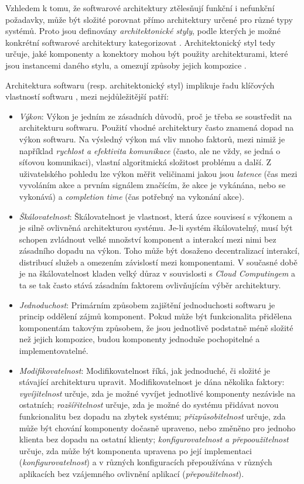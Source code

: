 Vzhledem k tomu, že softwarové architektury ztělesňují funkční i nefunkční požadavky, může být složité porovnat přímo architektury určené pro různé typy systémů. Proto jsou definovány \textit{architektonické styly}, podle kterých je možné konkrétní softwarové architektury kategorizovat \cite{Nitto99}. Architektonický styl tedy určuje, jaké komponenty a konektory mohou být použity architekturami, které jsou instancemi daného stylu, a omezují způsoby jejich kompozice \cite{Garlan95}.

Architektura softwaru (resp. architektonický styl) implikuje řadu klíčových vlastností softwaru \cite{Ghezzi03}, mezi nejdůležitější patří:
\begin{itemize}
  \item{\textit{Výkon}}: Výkon je jedním ze zásadních důvodů, proč je třeba se soustředit na architekturu softwaru. Použití vhodné architektury často znamená dopad na výkon softwaru. Na výsledný výkon má vliv mnoho faktorů, mezi nimiž je například \textit{rychlost a efektivita komunikace} (často, ale ne vždy, se jedná o síťovou komunikaci), vlastní algoritmická složitost problému a další. Z uživatelského pohledu lze výkon měřit veličinami jakou jsou \textit{latence} (čas mezi vyvoláním akce a prvním signálem značícím, že akce je vykánána, nebo se vykonává) a \textit{completion time} (čas potřebný na vykonání akce).
  \item{\textit{Škálovatelnost}}: Škálovatelnost je vlastnost, která úzce souvisesí s výkonem a je silně ovlivněná architekturou systému. Je-li systém škálovatelný, musí být schopen zvládnout velké množství komponent a interakcí mezi nimi bez zásadního dopadu na výkon. Toho může být dosaženo decentralizací interakcí, distribucí služeb a omezením závislostí mezi komponentami. V současné době je na škálovatelnost kladen velký důraz v souvislosti s \textit{Cloud Computingem} \cite{Mell11} a ta se tak často stává zásadním faktorem ovlivňujícím výběr architektury.
  \item{\textit{Jednoduchost}}: Primárním způsobem zajištění jednoduchosti softwaru je princip oddělení zájmů komponent. Pokud může být funkcionalita přidělena komponentám takovým způsobem, že jsou jednotlivě podstatně méně složité než jejich kompozice, budou komponenty jednoduše pochopitelné a implementovatelné.
  \item{\textit{Modifikovatelnost}}: Modifikovatelnost říká, jak jednoduché, či složité je stávající architekturu upravit. Modifikovatelnost je dána několika faktory: \textit{vyvíjitelnost} určuje, zda je možné vyvíjet jednotlivé komponenty nezávisle na ostatních; \textit{rozšířitelnost} určuje, zda je možné do systému přidávat novou funkcionalitu bez dopadu na zbytek systému; \textit{přizpůsobitelnost} určuje, zda může být chování komponenty dočasně upraveno, nebo změněno pro jednoho klienta bez dopadu na ostatní klienty; \textit{konfigurovatelnost a přepooužitelnost} určuje, zda může být komponenta upravena po její implementaci (\textit{konfigurovatelnost}) a v různých konfiguracích přepoužívána v různých aplikacích bez vzájemného ovlivnění aplikací (\textit{přepoužitelnost}).

\end{itemize}
